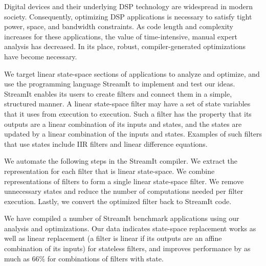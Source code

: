 %

    Digital devices and their underlying DSP technology are
widespread in modern society. Consequently, optimizing DSP
applications is necessary to satisfy tight power, space, and
bandwidth constraints. As code length and complexity increases for
these applications, the value of time-intensive, manual expert
analysis has decreased. In its place, robust, compiler-generated
optimizations have become necessary.

    We target linear state-space sections of applications to
analyze and optimize, and use the programming language StreamIt to
implement and test our ideas. StreamIt enables its users to create
filters and connect them in a simple, structured manner. A linear
state-space filter may have a set of state variables that it uses
from execution to execution. Such a filter has the property that
its outputs are a linear combination of its inputs and states, and
the states are updated by a linear combination of the inputs and
states. Examples of such filters that use states include IIR
filters and linear difference equations.

    We automate the following steps in the StreamIt compiler. We
extract the representation for each filter that is linear
state-space. We combine representations of filters to form a
single linear state-space filter. We remove unnecessary states and
reduce the number of computations needed per filter execution.
Lastly, we convert the optimized filter back to StreamIt code.

    We have compiled a number of StreamIt benchmark applications
using our analysis and optimizations. Our data indicates
state-space replacement works as well as linear replacement (a
filter is linear if its outputs are an affine combination of its
inputs) for stateless filters, and improves performance by as much
as 66\% for combinations of filters with state.
